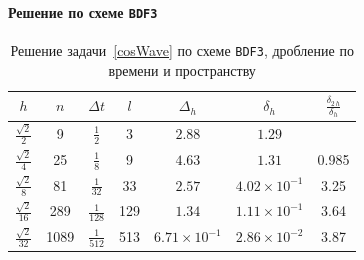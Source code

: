 \paragraph{Решение по схеме \texttt{BDF3}}

\begin{table}[H]
\caption{Решение задачи~\ref{cosWave} по схеме \texttt{BDF3}, дробление по времени и пространству}
\label{tab:BDF3cosWaveFull}
	\begin{center}\begin{tabular}{|c|c|c|c|c|c|c|}
		\hline
		$h$ & $n$ & $\Delta t$ & $l$ & $\Delta_h$ & $\delta_h$ & $\frac{\delta_{2 \, h}}{\delta_h}$ \\
		\hline
		$\frac{\sqrt{2}}{2}$ & 9 & $\frac{1}{2}$ & 3 & $2.88$ & $1.29$ & \\
		\hline
		$\frac{\sqrt{2}}{4}$ & 25 & $\frac{1}{8}$ & 9 & $4.63$ & $1.31$ & 0.985 \\
		\hline
		$\frac{\sqrt{2}}{8}$ & 81 & $\frac{1}{32}$ & 33 & $2.57$ & $4.02 \times 10^{-1}$ & 3.25 \\
		\hline
		$\frac{\sqrt{2}}{16}$ & 289 & $\frac{1}{128}$ & 129 & $1.34$ & $1.11 \times 10^{-1}$ & 3.64 \\
		\hline
		$\frac{\sqrt{2}}{32}$ & 1089 & $\frac{1}{512}$ & 513 & $6.71 \times 10^{-1}$ & $2.86 \times 10^{-2}$ & 3.87 \\
		\hline
	\end{tabular}\end{center}
\end{table}

